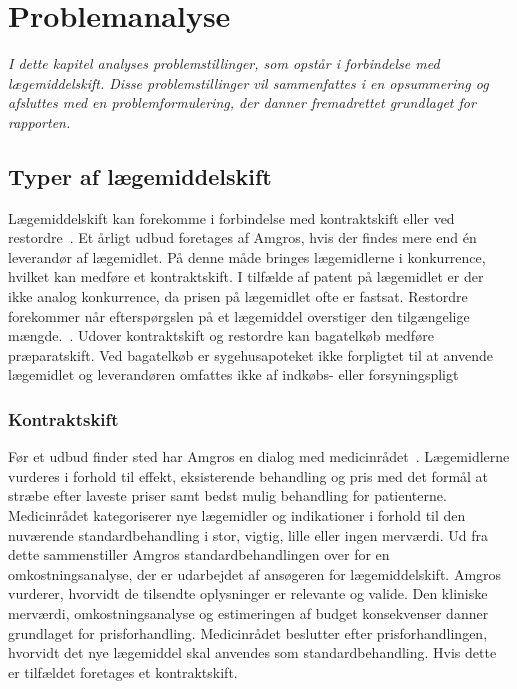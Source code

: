 \chapter{Problemanalyse}
\textit{I dette kapitel analyses problemstillinger, som opstår i forbindelse med lægemiddelskift. Disse problemstillinger vil sammenfattes i en opsummering og afsluttes med en problemformulering, der danner fremadrettet grundlaget for rapporten.}

\section{Typer af lægemiddelskift}
Lægemiddelskift kan forekomme i forbindelse med kontraktskift eller ved restordre~\citep{Amgros2015}. Et årligt udbud foretages af Amgros, hvis der findes mere end én leverandør af lægemidlet. På denne måde bringes lægemidlerne i konkurrence, hvilket kan medføre et kontraktskift. I tilfælde af patent på lægemidlet er der ikke analog konkurrence, da prisen på lægemidlet ofte er fastsat. Restordre forekommer når efterspørgslen på et lægemiddel overstiger den tilgængelige mængde.~\citep{Amgros2015}. Udover kontraktskift og restordre kan bagatelkøb medføre præparatskift. Ved bagatelkøb er sygehusapoteket ikke forpligtet til at anvende lægemidlet og leverandøren omfattes ikke af indkøbs- eller forsyningspligt~

\subsection{Kontraktskift}
Før et udbud finder sted har Amgros en dialog med medicinrådet~\citep{Amgros2017, Amgros2017a}. Lægemidlerne vurderes i forhold til effekt, eksisterende behandling og pris med det formål at stræbe efter laveste priser samt bedst mulig behandling for patienterne. Medicinrådet kategoriserer nye lægemidler og indikationer i forhold til den nuværende standardbehandling i stor, vigtig, lille eller ingen merværdi. Ud fra dette sammenstiller Amgros standardbehandlingen over for en omkostningsanalyse, der er udarbejdet af ansøgeren for lægemiddelskift. Amgros vurderer, hvorvidt de tilsendte oplysninger er relevante og valide. Den kliniske merværdi, omkostningsanalyse og estimeringen af budget konsekvenser danner grundlaget for prisforhandling. Medicinrådet beslutter efter prisforhandlingen, hvorvidt det nye lægemiddel skal anvendes som standardbehandling. Hvis dette er tilfældet foretages et kontraktskift.~\citep{Amgros2017, Amgros2017a}

